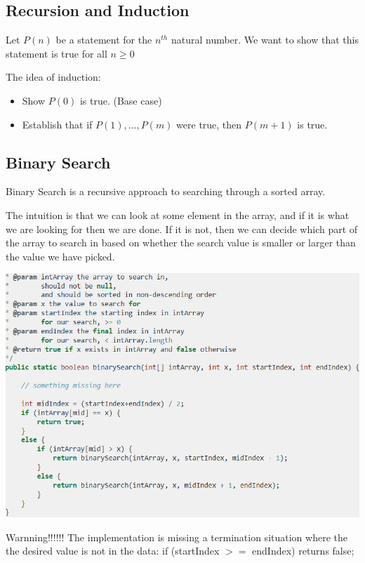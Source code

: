 \documentclass[letterpaper,12pt]{article}
\begin{document}
\subsection{Recursion and Induction}

Let $P(n)$ be a statement for the $n^{th}$ natural number. We want to show that
this statement is true for all $n\ge 0$

The idea of induction:
\begin{itemize}
      \item Show $P(0)$ is true. (Base case)
      \item Establish that if $P(1),\ldots,P(m)$ were true, then $P(m+1)$ is true.
\end{itemize}

\subsection{Binary Search}

Binary Search is a recursive approach to searching through a sorted array.

The intuition is that we can look at some element in the array, and if it is
what we are looking for then we are done. If it is not, then we can decide
which part of the array to search in based on whether the search value is
smaller or larger than the value we have picked.

\includegraphics*[scale = 0.7]{./summary_image/Binary Search.png}

Warnning!!!!!! The implementation is missing a termination situation where the
the desired value is not in the data: if (startIndex $>=$ endIndex) returns false;
\end{document}
